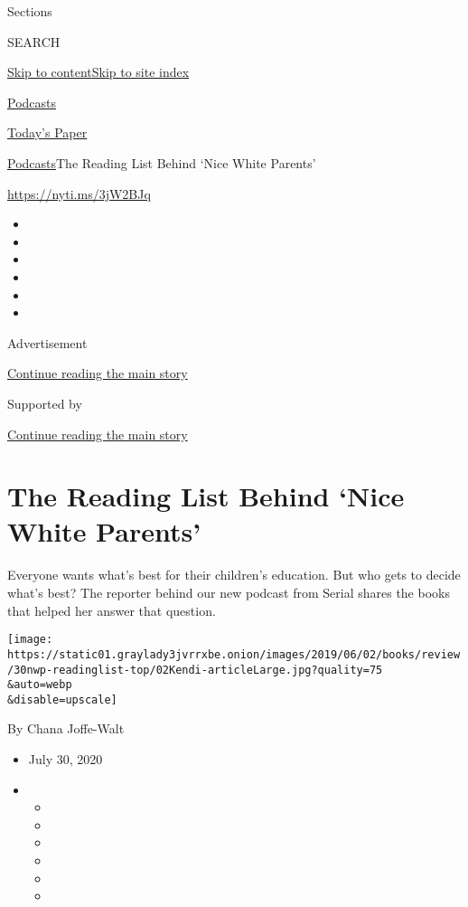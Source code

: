 Sections

SEARCH

\protect\hyperlink{site-content}{Skip to
content}\protect\hyperlink{site-index}{Skip to site index}

\href{https://www.nytimes3xbfgragh.onion/spotlight/podcasts}{Podcasts}

\href{https://myaccount.nytimes3xbfgragh.onion/auth/login?response_type=cookie\&client_id=vi}{}

\href{https://www.nytimes3xbfgragh.onion/section/todayspaper}{Today's
Paper}

\href{/spotlight/podcasts}{Podcasts}\textbar{}The Reading List Behind
`Nice White Parents'

\url{https://nyti.ms/3jW2BJq}

\begin{itemize}
\item
\item
\item
\item
\item
\item
\end{itemize}

Advertisement

\protect\hyperlink{after-top}{Continue reading the main story}

Supported by

\protect\hyperlink{after-sponsor}{Continue reading the main story}

\hypertarget{the-reading-list-behind-nice-white-parents}{%
\section{The Reading List Behind `Nice White
Parents'}\label{the-reading-list-behind-nice-white-parents}}

Everyone wants what's best for their children's education. But who gets
to decide what's best? The reporter behind our new podcast from Serial
shares the books that helped her answer that question.

\texttt{[image: https://static01.graylady3jvrrxbe.onion/images/2019/06/02/books/review/30nwp-readinglist-top/02Kendi-articleLarge.jpg?quality=75\\\&auto=webp\\\&disable=upscale]}

By Chana Joffe-Walt

\begin{itemize}
\item
  July 30, 2020
\item
  \begin{itemize}
  \item
  \item
  \item
  \item
  \item
  \item
  \end{itemize}
\end{itemize}

